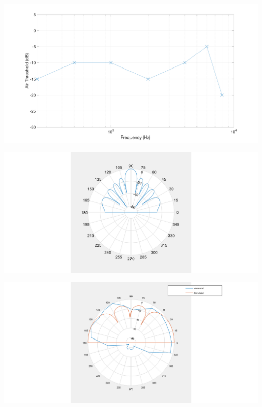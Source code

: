 \documentclass[landscape,a1paper,fontscale=0.45]{baposter} %
\begin{document}
\begin{poster}
{\begin{multicols}{2}
\begin{center}
	\includegraphics[width=0.8\linewidth]{audiogram.png}
\end{center}

\end{multicols}

\begin{multicols}{2}
	\vspace{1em}
	
	\begin{center}
		\includegraphics[width=0.8\linewidth]{polar90degSoftware.png}
	\end{center}

\end{multicols}


\begin{multicols}{2}
\vspace{1em}

\begin{center}
	\includegraphics[width=0.8\linewidth]{deg0hardware.png}
\end{center}


\end{multicols}}
\end{poster}
\end{document}
